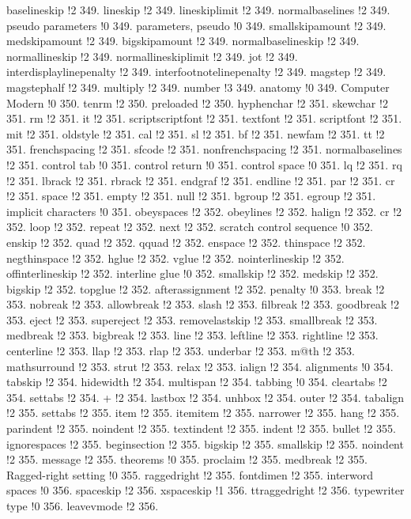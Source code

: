 baselineskip !2 349.
lineskip !2 349.
lineskiplimit !2 349.
normalbaselines !2 349.
pseudo parameters !0 349.
parameters, pseudo !0 349.
smallskipamount !2 349.
medskipamount !2 349.
bigskipamount !2 349.
normalbaselineskip !2 349.
normallineskip !2 349.
normallineskiplimit !2 349.
jot !2 349.
interdisplaylinepenalty !2 349.
interfootnotelinepenalty !2 349.
magstep !2 349.
magstephalf !2 349.
multiply !2 349.
number !3 349.
anatomy !0 349.
Computer Modern !0 350.
tenrm !2 350.
preloaded !2 350.
hyphenchar !2 351.
skewchar !2 351.
rm !2 351.
it !2 351.
scriptscriptfont !2 351.
textfont !2 351.
scriptfont !2 351.
mit !2 351.
oldstyle !2 351.
cal !2 351.
sl !2 351.
bf !2 351.
newfam !2 351.
tt !2 351.
frenchspacing !2 351.
sfcode !2 351.
nonfrenchspacing !2 351.
normalbaselines !2 351.
control tab !0 351.
control return !0 351.
control space !0 351.
lq !2 351.
rq !2 351.
lbrack !2 351.
rbrack !2 351.
endgraf !2 351.
endline !2 351.
par !2 351.
cr !2 351.
space !2 351.
empty !2 351.
null !2 351.
bgroup !2 351.
egroup !2 351.
implicit characters !0 351.
obeyspaces !2 352.
obeylines !2 352.
halign !2 352.
cr !2 352.
loop !2 352.
repeat !2 352.
next !2 352.
scratch control sequence !0 352.
enskip !2 352.
quad !2 352.
qquad !2 352.
enspace !2 352.
thinspace !2 352.
negthinspace !2 352.
hglue !2 352.
vglue !2 352.
nointerlineskip !2 352.
offinterlineskip !2 352.
interline glue !0 352.
smallskip !2 352.
medskip !2 352.
bigskip !2 352.
topglue !2 352.
afterassignment !2 352.
penalty !0 353.
break !2 353.
nobreak !2 353.
allowbreak !2 353.
slash !2 353.
filbreak !2 353.
goodbreak !2 353.
eject !2 353.
supereject !2 353.
removelastskip !2 353.
smallbreak !2 353.
medbreak !2 353.
bigbreak !2 353.
line !2 353.
leftline !2 353.
rightline !2 353.
centerline !2 353.
llap !2 353.
rlap !2 353.
underbar !2 353.
m@th !2 353.
mathsurround !2 353.
strut !2 353.
relax !2 353.
ialign !2 354.
alignments !0 354.
tabskip !2 354.
hidewidth !2 354.
multispan !2 354.
tabbing !0 354.
cleartabs !2 354.
settabs !2 354.
+ !2 354.
lastbox !2 354.
unhbox !2 354.
outer !2 354.
tabalign !2 355.
settabs !2 355.
item !2 355.
itemitem !2 355.
narrower !2 355.
hang !2 355.
parindent !2 355.
noindent !2 355.
textindent !2 355.
indent !2 355.
bullet !2 355.
ignorespaces !2 355.
beginsection !2 355.
bigskip !2 355.
smallskip !2 355.
noindent !2 355.
message !2 355.
theorems !0 355.
proclaim !2 355.
medbreak !2 355.
Ragged-right setting !0 355.
raggedright !2 355.
fontdimen !2 355.
interword spaces !0 356.
spaceskip !2 356.
xspaceskip !1 356.
ttraggedright !2 356.
typewriter type !0 356.
leavevmode !2 356.

